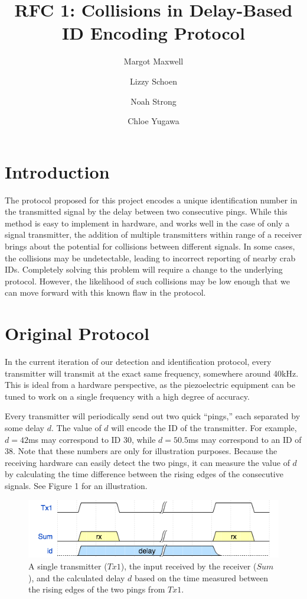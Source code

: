 \documentclass[12pt]{article}
\title{RFC 1: Collisions in Delay-Based ID Encoding Protocol}
\author{
	Margot Maxwell \and
	Lizzy Schoen \and
	Noah Strong \and
	Chloe Yugawa
}
\begin{document}
\maketitle

\tableofcontents{}


\section{Introduction}

The protocol proposed for this project encodes a unique identification number
in the transmitted signal by the delay between two consecutive pings.
While this method is easy to implement in hardware, and works well in the case
of only a signal transmitter, the addition of multiple transmitters within range
of a receiver brings about the potential for collisions between different
signals.
In some cases, the collisions may be undetectable, leading to incorrect
reporting of nearby crab IDs.
Completely solving this problem will require a change to the underlying
protocol.
However, the likelihood of such collisions may be low enough that we can move
forward with this known flaw in the protocol.

\section{Original Protocol}

In the current iteration of our detection and identification protocol, every
transmitter will transmit at the exact same frequency, somewhere around
40kHz. This is ideal from a hardware perspective, as the piezoelectric
equipment can be tuned to work on a single frequency with a high degree of
accuracy.

Every transmitter will periodically send out two quick ``pings,'' each separated
by some delay $d$. The value of $d$ will encode the ID of the transmitter.
For example, $d=42$ms may correspond to ID 30, while $d=50.5$ms may
correspond to an ID of 38.
Note that these numbers are only for illustration purposes.
Because the receiving hardware can easily detect the two pings, it can measure
the value of $d$ by calculating the time difference between the rising edges
of the consecutive signals. See Figure 1 for an illustration.

\begin{figure}[h]
\centering
\includegraphics[scale=0.7]{singleTx}

\caption{A single transmitter ($Tx1$), the input received by the receiver
($Sum$), and the calculated delay $d$ based on the time measured between
the rising edges of the two pings from $Tx1$.}
\end{figure}
\end{document}
